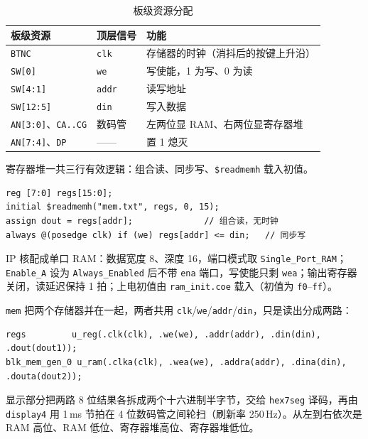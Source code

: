 \documentclass[12pt, a4paper]{ctexart}
\begin{document}
\begin{table}[htbp]
    \centering
    \caption{板级资源分配}
    \label{tab:io}
    \begin{tabular}{lll}
        \hline
        板级资源 & 顶层信号 & 功能 \\
        \hline
        \texttt{BTNC} & \texttt{clk} & 存储器的时钟（消抖后的按键上升沿）\\
        \texttt{SW[0]} & \texttt{we} & 写使能，1 为写、0 为读 \\
        \texttt{SW[4:1]} & \texttt{addr} & 读写地址 \\
        \texttt{SW[12:5]} & \texttt{din} & 写入数据 \\
        \texttt{AN[3:0]}、\texttt{CA..CG} & 数码管 & 左两位显 RAM、右两位显寄存器堆 \\
        \texttt{AN[7:4]}、\texttt{DP} & —— & 置 1 熄灭 \\
        \hline
    \end{tabular}
\end{table}

寄存器堆一共三行有效逻辑：组合读、同步写、\texttt{\$readmemh} 载入初值。

\begin{lstlisting}
reg [7:0] regs[15:0];
initial $readmemh("mem.txt", regs, 0, 15);
assign dout = regs[addr];              // 组合读，无时钟
always @(posedge clk) if (we) regs[addr] <= din;   // 同步写
\end{lstlisting}

IP 核配成单口 RAM：数据宽度 8、深度 16，端口模式取 \texttt{Single\_Port\_RAM}；\texttt{Enable\_A} 设为 \texttt{Always\_Enabled} 后不带 \texttt{ena} 端口，写使能只剩 \texttt{wea}；输出寄存器关闭，读延迟保持 1 拍；上电初值由 \texttt{ram\_init.coe} 载入（初值为 \texttt{f0}--\texttt{ff}）。

\texttt{mem} 把两个存储器并在一起，两者共用 \texttt{clk}/\texttt{we}/\texttt{addr}/\texttt{din}，只是读出分成两路：

\begin{lstlisting}
regs         u_reg(.clk(clk), .we(we), .addr(addr), .din(din), .dout(dout1));
blk_mem_gen_0 u_ram(.clka(clk), .wea(we), .addra(addr), .dina(din), .douta(dout2));
\end{lstlisting}

显示部分把两路 8 位结果各拆成两个十六进制半字节，交给 \texttt{hex7seg} 译码，再由 \texttt{display4} 用 1\,ms 节拍在 4 位数码管之间轮扫（刷新率 250\,Hz）。从左到右依次是 RAM 高位、RAM 低位、寄存器堆高位、寄存器堆低位。
\end{document}
